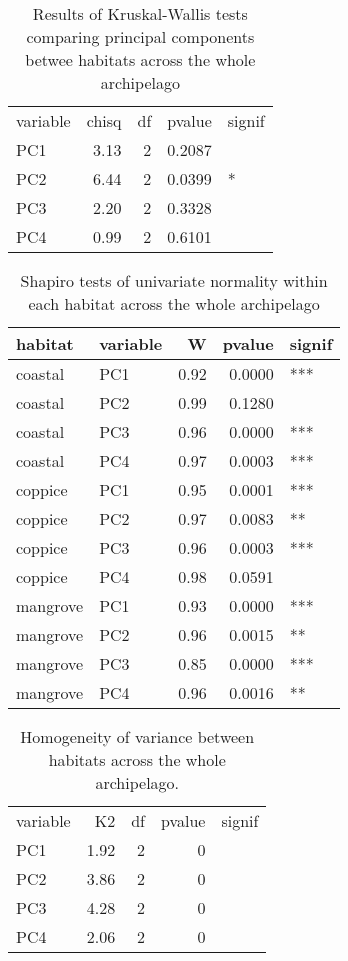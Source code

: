 \begin{table}[H]
    \centering
    \begin{tabular}{l|r|r|r|l}
    variable & chisq & df & pvalue & signif\\
    PC1 & 3.13 & 2 & 0.2087 & \\
    PC2 & 6.44 & 2 & 0.0399 & *\\
    PC3 & 2.20 & 2 & 0.3328 & \\
    PC4 & 0.99 & 2 & 0.6101 & \\
    \end{tabular}
    \caption{Results of Kruskal-Wallis tests comparing principal components betwee habitats across the whole archipelago}
    \label{suptab:kruskal_pooled}
\end{table}

\begin{table}[H]
    \centering
    \begin{tabular}{llrrl}
        \hline
        habitat & variable & W & pvalue & signif\\
        \hline
        coastal & PC1 & 0.92 & 0.0000 & ***\\
        coastal & PC2 & 0.99 & 0.1280 & \\
        coastal & PC3 & 0.96 & 0.0000 & ***\\
        coastal & PC4 & 0.97 & 0.0003 & ***\\
        coppice & PC1 & 0.95 & 0.0001 & ***\\
        coppice & PC2 & 0.97 & 0.0083 & **\\
        coppice & PC3 & 0.96 & 0.0003 & ***\\
        coppice & PC4 & 0.98 & 0.0591 & \\
        mangrove & PC1 & 0.93 & 0.0000 & ***\\
        mangrove & PC2 & 0.96 & 0.0015 & **\\
        mangrove & PC3 & 0.85 & 0.0000 & ***\\
        mangrove & PC4 & 0.96 & 0.0016 & **\\
        \hline
    \end{tabular}
    \caption{Shapiro tests of univariate normality within each habitat across the whole archipelago}
    \label{suptab:norm_pooled}
\end{table}

\begin{table}[H]
    \centering
    \begin{tabular}{l|r|r|r|l}
    variable & K2 & df & pvalue & signif\\
    PC1 & 1.92 & 2 & 0 & \\
    PC2 & 3.86 & 2 & 0 & \\
    PC3 & 4.28 & 2 & 0 & \\
    PC4 & 2.06 & 2 & 0 & \\
    \end{tabular}
    \caption{Homogeneity of variance between habitats across the whole archipelago.}
    \label{suptab:var_pooled}
\end{table}